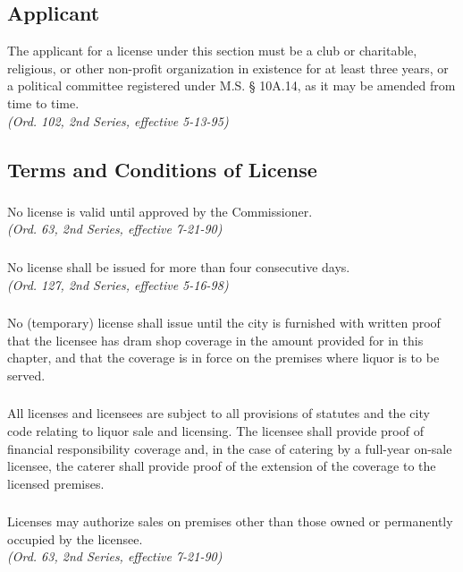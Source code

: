 \subsection{Applicant}
The applicant for a license under this section must be a club or charitable, religious, or other non-profit organization in existence for at least three years, or a political committee registered under M.S. § 10A.14, as it may be amended from time to time.\\
\emph{(Ord. 102, 2nd Series, effective 5-13-95)}
\subsection{Terms and Conditions of License}
\subsubsection{}
No license is valid until approved by the Commissioner.\\
\emph{(Ord. 63, 2nd Series, effective 7-21-90)}
\subsubsection{}
No license shall be issued for more than four consecutive days.\\
\emph{(Ord. 127, 2nd Series, effective 5-16-98)}
\subsubsection{}
No (temporary) license shall issue until the city is furnished with written proof that the licensee has dram shop coverage in the amount provided for in this chapter, and that the coverage is in force on the premises where liquor is to be served.
\subsubsection{}
All licenses and licensees are subject to all provisions of statutes and the city code relating to liquor sale and licensing.  The licensee shall provide proof of financial responsibility coverage and, in the case of catering by a full-year on-sale licensee, the caterer shall provide proof of the extension of the coverage to the licensed premises.
\subsubsection{}
Licenses may authorize sales on premises other than those owned or permanently occupied by the licensee.\\
\emph{(Ord. 63, 2nd Series, effective 7-21-90)}
